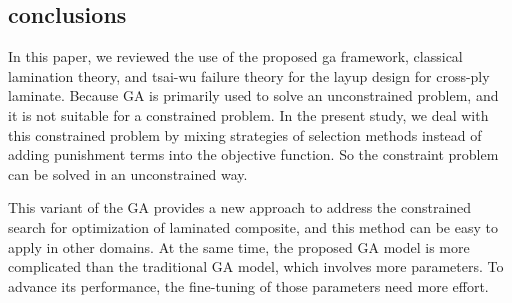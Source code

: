 \subsection{conclusions}
In this paper, we reviewed the use of the proposed ga framework, classical
lamination theory, and tsai-wu failure theory for the layup design for
cross-ply laminate. Because GA is primarily used to solve an unconstrained
problem, and it is not suitable for a constrained problem. In the present
study, we deal with this constrained problem by mixing strategies of selection
methods instead of adding punishment terms into the objective function. So the
constraint problem can be solved in an unconstrained way.

This variant of the GA provides a new approach to address the constrained
search for optimization of laminated composite, and this method can be easy
to apply in other domains. At the same time, the proposed GA model is more
complicated than the traditional GA model, which involves more parameters. To
advance its performance, the fine-tuning of those parameters need more effort. 
